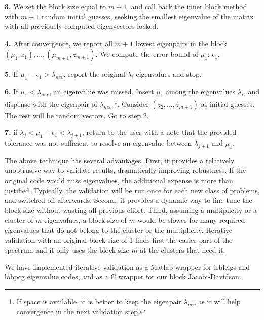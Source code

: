 \documentclass{report}
\begin{document}
{\bf 3.}
We set the block size equal to $m+1$, and call back the inner
block method with $m+1$ random initial guesses,
seeking the smallest eigenvalue of the matrix with
all previously computed eigenvectors locked.

{\bf 4.}
After convergence, we report all $m+1$ lowest eigenpairs in the block
$(\mu_1, z_1), \ldots , (\mu_{m+1}, z_{m+1})$.
We compute the error bound of $\mu_1$: $\epsilon_1$.

{\bf 5.}
If $\mu_1 - \epsilon_1 > \lambda_{nev}$, report the original $\lambda_i$
eigenvalues and stop.

{\bf 6.}
If $\mu_1 < \lambda_{nev}$, an eigenvalue was missed.
Insert $\mu_1$ among the eigenvalues $\lambda_i$,
and dispense with the eigenpair of $\lambda_{nev}$
\footnote{If space is available, it is better to keep the
eigenpair $\lambda_{nev}$ as it will help convergence in the
next validation step.}.
Consider $(z_2, \ldots , z_{m+1})$ as initial guesses. The rest
will be random vectors.
Go to step 2.

{\bf 7.}
if $\lambda_j < \mu_1 - \epsilon_1 < \lambda_{j+1}$, return to the
user with a note that the provided tolerance
was not sufficient to resolve an eigenvalue between $\lambda_{j+1}$
and $\mu_1$.

The above technique has several advantages.
First, it provides a relatively unobtrusive way to
validate results, dramatically improving robustness.
If the original code would miss eigenvalues,
the additional expense is more than justified.
Typically, the validation will be run once for each new class of
problems, and switched off afterwards.
Second, it provides a dynamic way to fine tune the block size without
wasting all previous effort.
Third, assuming a multiplicity or a cluster of $m$ eigenvalues,
a block size of $m$ would be slower for many
required eigenvalues that do not belong to the cluster or
the multiplicity.
Iterative validation with an original block size of 1 finds first
the easier part of the spectrum and it only uses the block size
$m$ at the clusters that need it.

We have implemented iterative validation as a Matlab wrapper for
\mbox{irbleigs} and \mbox{lobpcg} eigenvalue codes, and as a C
wrapper for our block Jacobi-Davidson.
\end{document}
